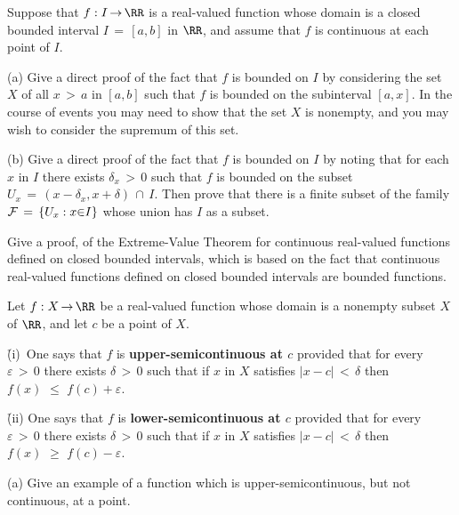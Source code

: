 \V

        Suppose that $f:I \,{\rightarrow}\, {\RR}$ is a real-valued function whose domain is a closed bounded interval $I \,=\, [a,b]$ in ${\RR}$,
    and assume that $f$ is continuous at each point of $I$.

\V

        (a) Give a direct proof of the fact that $f$ is bounded on $I$ by considering the set $X$ of all $x\,>\,a$ in $[a,b]$ such that $f$ is bounded on the subinterval $[a,x]$.
    In the course of events you may need to show that the set $X$ is nonempty, and you may wish to consider the supremum of this set.

\V

        (b) Give a direct proof of the fact that $f$ is bounded on $I$ by noting that for each $x$ in $I$ there exists ${\delta}_{x}\,>\,0$ such that
    $f$ is bounded on the subset $U_{x} \,=\, (x-{\delta}_{x},x+{\delta})\,{\cap}\,I$. Then prove that there is a finite subset of the family ${\cal F} \,=\, \{U_{x}:x{\in}I\}$ whose union has $I$ as a subset.

\V
\V

\noindent \ExDq Give a proof, of the Extreme-Value Theorem for continuous real-valued functions defined on closed bounded intervals, which is based on the fact that continuous real-valued functions defined on closed bounded intervals are bounded functions.

\V
\V

\noindent {} Let $f:X \,{\rightarrow}\, {\RR}$ be a real-valued function whose domain is a nonempty subset $X$ of ${\RR}$,
    and let $c$ be a point of $X$.

        \h (i)\, One says that $f$ is {\bf upper-semicontinuous at $c$} provided that for every ${\varepsilon}\,>\,0$ there exists ${\delta}\,>\,0$
    such that if $x$ in $X$ satisfies $|x-c|\,<\,{\delta}$ then $f(x)\,\,{\leq}\,\,f(c) + {\varepsilon}$.

        \h (ii) One says that $f$ is {\bf lower-semicontinuous at $c$} provided that for every ${\varepsilon}\,>\,0$ there exists ${\delta}\,>\,0$
    such that if $x$ in $X$ satisfies $|x-c|\,<\,{\delta}$ then $f(x)\,\,{\geq}\,\,f(c) - {\varepsilon}$.



\V

        (a) Give an example of a function which is upper-semicontinuous, but not continuous, at a point.

\V

